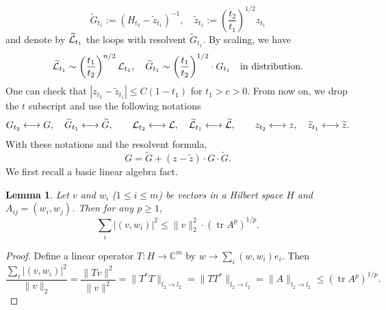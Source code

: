 \documentclass[10pt,reqno]{article}
\theoremstyle{plain} %
\newtheorem{lemma}[theorem]{Lemma}
\theoremstyle{remark}
\numberwithin{equation}{section}
\begin{document}
$$
\widetilde{ G}_{t_1}:= 
\left(  H_{t_2}-
 \widetilde z_{t_1}\right)^{-1},\quad 
 \widetilde z_{t_1}:=\left(\frac{t_2}{t_1}\right)^{1/2}z_{t_1}
$$
and denote by   \(\widetilde{\cal L}_{t_1}\)  the loops   with resolvent  \(\widetilde{G}_{t_1}\).
By scaling, we have 
\begin{equation}\label{calLcalL}
  \widetilde{\cal L}_{t_1}\sim \left(\frac{t_1}{t_2}\right)^{n/2} {\cal L}_{t_1}, \quad  
  \widetilde{ G}_{t_1}\sim \left(\frac{t_1}{t_2}\right)^{1/2}\cdot { G}_{t_1} \quad \hbox{in distribution}.  
\end{equation}
One can check that $|z_{t_2}-\widetilde{z}_{t_1}|\le C(1-t_1)$ for  $t_1>c>0$.   From now on,  we drop the $t$ subscript 
and use the following notations 
\begin{align}\label{GGLLzz}
G_{t_2} \longleftrightarrow  G,\quad \widetilde{G}_{t_1} \longleftrightarrow   \widetilde{G},\quad\quad
{\cal L}_{t_2} \longleftrightarrow  {\cal L},\quad \widetilde{{\cal L}}_{t_1} \longleftrightarrow   \widetilde{{\cal L}},
\quad\quad
{z}_{t_2} \longleftrightarrow  {z},\quad \widetilde{{z}}_{t_1} \longleftrightarrow   \widetilde{{z}}.
\end{align}
With these notations and the resolvent formula, 
\begin{equation}\label{GGZGG}
  G=\widetilde{G}+(z-\widetilde{z})\cdot G\cdot \widetilde{G}  .
\end{equation}
We first recall a basic linear algebra fact. 

\begin{lemma}\label{lem_L2Loc}
Let $v$ and $w_i$ ($1 \le i \le m$) be vectors in a Hilbert space $H$ and  $A_{ij} = (w_i, w_j)$.
Then for any $p \ge 1$,
$$
\sum_i |(v, w_i)|^2 \le \|v\|_2^2 \cdot (\operatorname{tr} A^p)^{1/p}.
$$
\end{lemma}

\begin{proof}
Define a linear operator $T: H \to \mathbb{C}^m$ by $w \to \sum_i (w, w_i) e_i$. Then
$$
\frac{\sum_i |(v, w_i)|^2}{\|v\|_2} = \frac{\|Tv\|^2}{\|v\|^2} = \|T^* T\|_{l_2 \to l_2} = \|TT^*\|_{l_2 \to l_2} = \|A\|_{l_2 \to l_2} \le (\operatorname{tr} A^p)^{1/p}.
$$
\end{proof}
\end{document}
